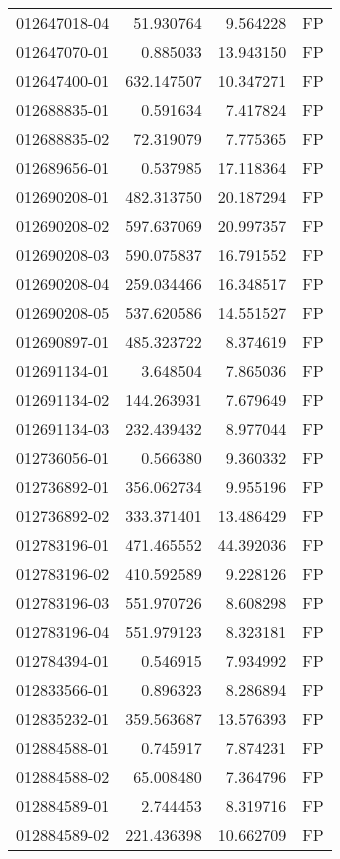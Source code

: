 \begin{tabular}{lrrl}
012647018-04 &   51.930764 &     9.564228 &   FP \\
012647070-01 &    0.885033 &    13.943150 &   FP \\
012647400-01 &  632.147507 &    10.347271 &   FP \\
012688835-01 &    0.591634 &     7.417824 &   FP \\
012688835-02 &   72.319079 &     7.775365 &   FP \\
012689656-01 &    0.537985 &    17.118364 &   FP \\
012690208-01 &  482.313750 &    20.187294 &   FP \\
012690208-02 &  597.637069 &    20.997357 &   FP \\
012690208-03 &  590.075837 &    16.791552 &   FP \\
012690208-04 &  259.034466 &    16.348517 &   FP \\
012690208-05 &  537.620586 &    14.551527 &   FP \\
012690897-01 &  485.323722 &     8.374619 &   FP \\
012691134-01 &    3.648504 &     7.865036 &   FP \\
012691134-02 &  144.263931 &     7.679649 &   FP \\
012691134-03 &  232.439432 &     8.977044 &   FP \\
012736056-01 &    0.566380 &     9.360332 &   FP \\
012736892-01 &  356.062734 &     9.955196 &   FP \\
012736892-02 &  333.371401 &    13.486429 &   FP \\
012783196-01 &  471.465552 &    44.392036 &   FP \\
012783196-02 &  410.592589 &     9.228126 &   FP \\
012783196-03 &  551.970726 &     8.608298 &   FP \\
012783196-04 &  551.979123 &     8.323181 &   FP \\
012784394-01 &    0.546915 &     7.934992 &   FP \\
012833566-01 &    0.896323 &     8.286894 &   FP \\
012835232-01 &  359.563687 &    13.576393 &   FP \\
012884588-01 &    0.745917 &     7.874231 &   FP \\
012884588-02 &   65.008480 &     7.364796 &   FP \\
012884589-01 &    2.744453 &     8.319716 &   FP \\
012884589-02 &  221.436398 &    10.662709 &   FP \\

\end{tabular}
